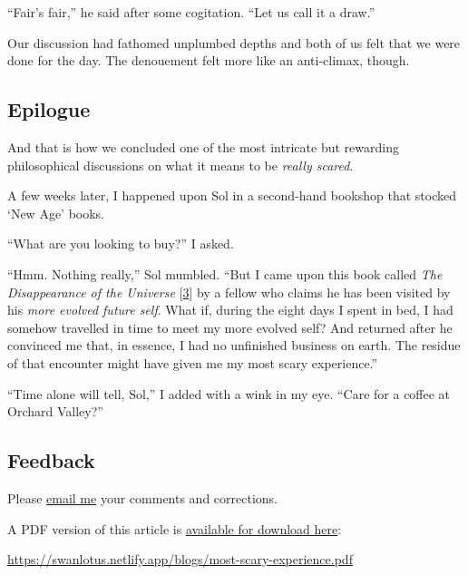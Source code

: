 \documentclass[
  a4paper,
]{article}
\begin{document}
``Fair's fair,'' he said after some cogitation. ``Let us call it a
draw.''

Our discussion had fathomed unplumbed depths and both of us felt that we
were done for the day. The denouement felt more like an anti-climax,
though.

\hypertarget{epilogue}{%
\subsection{Epilogue}\label{epilogue}}

And that is how we concluded one of the most intricate but rewarding
philosophical discussions on what it means to be \emph{really scared}.

A few weeks later, I happened upon Sol in a second-hand bookshop that
stocked `New Age' books.

``What are you looking to buy?'' I asked.

``Hmm. Nothing really,'' Sol mumbled. ``But I came upon this book called
\emph{The Disappearance of the Universe}
{[}\protect\hyperlink{ref-renard2004}{3}{]} by a fellow who claims he
has been visited by his \emph{more evolved future self}. What if, during
the eight days I spent in bed, I had somehow travelled in time to meet
my more evolved self? And returned after he convinced me that, in
essence, I had no unfinished business on earth. The residue of that
encounter might have given me my most scary experience.''

``Time alone will tell, Sol,'' I added with a wink in my eye. ``Care for
a coffee at Orchard Valley?''

\hypertarget{feedback}{%
\subsection{Feedback}\label{feedback}}

Please \href{mailto:feedback.swanlotus@gmail.com}{email me} your
comments and corrections.

\noindent A PDF version of this article is
\href{./most-scary-experience.pdf}{available for download here}:

\begin{small}

\begin{sffamily}

\url{https://swanlotus.netlify.app/blogs/most-scary-experience.pdf}

\end{sffamily}

\end{small}
\end{document}
